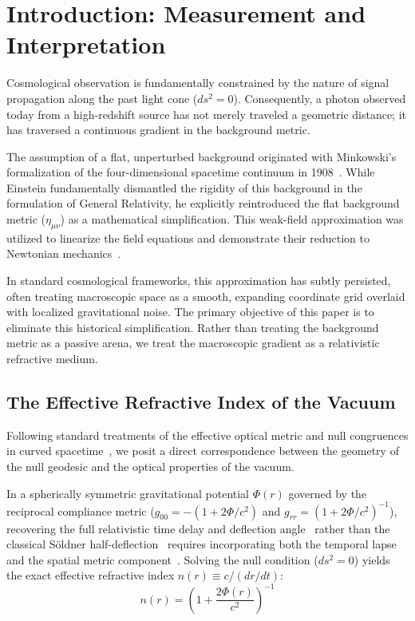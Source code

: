 \documentclass[11pt]{article}
\begin{document}
\section{Introduction: Measurement and Interpretation}
\label{sec:macroscopic_metric}

Cosmological observation is fundamentally constrained by the nature of signal propagation along the past light cone ($ds^2 = 0$). Consequently, a photon observed today from a high-redshift source has not merely traveled a geometric distance; it has traversed a continuous gradient in the background metric. 

The assumption of a flat, unperturbed background originated with Minkowski's formalization of the four-dimensional spacetime continuum in 1908~\cite{Minkowski1909}. While Einstein fundamentally dismantled the rigidity of this background in the formulation of General Relativity, he explicitly reintroduced the flat background metric ($\eta_{\mu\nu}$) as a mathematical simplification. This weak-field approximation was utilized to linearize the field equations and demonstrate their reduction to Newtonian mechanics~\cite{Einstein1916}. 

In standard cosmological frameworks, this approximation has subtly persisted, often treating macroscopic space as a smooth, expanding coordinate grid overlaid with localized gravitational noise. The primary objective of this paper is to eliminate this historical simplification. Rather than treating the background metric as a passive arena, we treat the macroscopic gradient as a relativistic refractive medium.

\subsection{The Effective Refractive Index of the Vacuum}
Following standard treatments of the effective optical metric and null congruences in curved spacetime~\cite{Gordon1923, Poisson2004}, we posit a direct correspondence between the geometry of the null geodesic and the optical properties of the vacuum. 

In a spherically symmetric gravitational potential $\Phi(r)$ governed by the reciprocal compliance metric ($g_{00} = -(1 + 2\Phi/c^2)$ and $g_{rr} = (1 + 2\Phi/c^2)^{-1}$), recovering the full relativistic time delay and deflection angle~\cite{Einstein1916, Eddington1920} rather than the classical S\"oldner half-deflection~\cite{Soldner1801} requires incorporating both the temporal lapse and the spatial metric component~\cite{Poisson2014}. Solving the null condition ($ds^2 = 0$) yields the exact effective refractive index $n(r) \equiv c / (dr/dt)$:
\begin{equation}
\label{eq:n_weak}
n(r) = \left(1 + \frac{2\Phi(r)}{c^2}\right)^{-1}
\end{equation}
\end{document}
